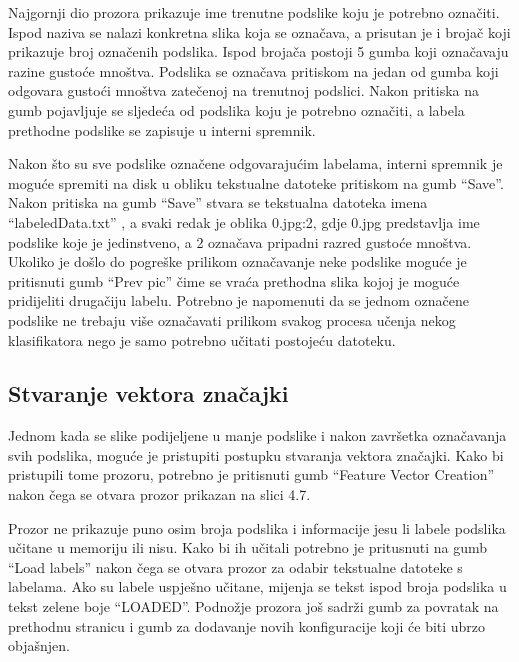\documentclass[times, utf8, zavrsni, numeric]{fer}
\begin{document}
\newpage

Najgornji dio prozora prikazuje ime trenutne podslike koju je potrebno označiti.
Ispod naziva se nalazi konkretna slika koja se označava, a prisutan je i brojač
koji prikazuje broj označenih podslika. Ispod brojača postoji 5 gumba koji
označavaju razine gustoće mnoštva. Podslika se označava pritiskom na jedan
od gumba koji odgovara gustoći mnoštva zatečenoj na trenutnoj podslici. Nakon pritiska
na gumb pojavljuje se sljedeća od podslika koju je potrebno označiti, a labela
prethodne podslike se zapisuje u interni spremnik. 

\bigbreak

Nakon što su sve podslike označene
odgovarajućim labelama, interni spremnik je moguće spremiti na disk u obliku 
tekstualne datoteke pritiskom na gumb \enquote{Save}. Nakon pritiska na gumb
\enquote{Save} stvara se tekstualna datoteka imena \enquote{labeledData.txt}
, a svaki redak je oblika 0.jpg:2, gdje 0.jpg predstavlja ime podslike koje 
je jedinstveno, a 2 označava pripadni razred gustoće mnoštva. Ukoliko je 
došlo do pogreške prilikom označavanje neke podslike moguće je pritisnuti
gumb \enquote{Prev pic} čime se vraća prethodna slika kojoj je moguće pridijeliti
drugačiju labelu. Potrebno je napomenuti da se jednom označene podslike ne trebaju 
više označavati prilikom svakog procesa učenja nekog klasifikatora nego 
je samo potrebno učitati postojeću datoteku.

\subsection{Stvaranje vektora značajki}

Jednom kada se slike podijeljene u manje podslike i nakon završetka označavanja
svih podslika, moguće je pristupiti postupku stvaranja vektora značajki. 
Kako bi pristupili tome prozoru, potrebno je pritisnuti gumb \enquote{Feature Vector Creation} 
nakon čega se otvara prozor prikazan na slici 4.7.

Prozor ne prikazuje puno osim broja podslika i informacije jesu li labele
podslika učitane u memoriju ili nisu. Kako bi ih učitali potrebno je pritusnuti
na gumb \enquote{Load labels} nakon čega se otvara prozor za odabir tekstualne datoteke
s labelama. Ako su labele uspješno učitane, mijenja se tekst ispod broja
podslika u tekst zelene boje \enquote{LOADED}. Podnožje prozora još sadrži gumb
za povratak na prethodnu stranicu i gumb za dodavanje novih konfiguracije koji će biti
ubrzo objašnjen. 
\end{document}
